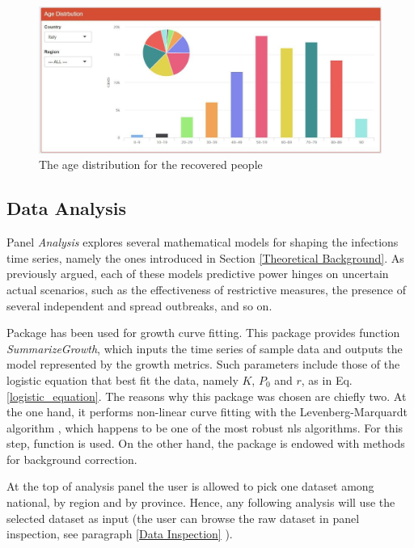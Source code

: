 \documentclass[
12pt, %
a4paper, %
oneside, %
headinclude,footinclude, %
BCOR5mm, %
]{scrartcl}
\begin{document}
\clearpage

\begin{figure}
  \centering
  \includegraphics[width=0.8\linewidth]{Figures/Age_distribution.jpg} 
  \caption{The age distribution for the recovered people}
  \label{fig:Age_distribution}
\end{figure}\hspace{0.3\textwidth}


\subsection{Data Analysis}\label{sub:Data Analysis}

Panel \textit{Analysis} explores  several mathematical models for shaping the infection\textquotesingle s time series, namely the ones introduced in Section \ref{Theoretical Background}. As previously argued, each of these model\textquotesingle s predictive power hinges on uncertain actual scenarios, such as the effectiveness of restrictive measures, the presence of several independent and spread outbreaks, and so on.

Package  \cite{growthcurver} has been used for growth curve fitting. This package provides function  \textit{SummarizeGrowth}, which inputs the time series of sample data and outputs the model represented by the growth metrics. Such parameters include those of the logistic equation that best fit the data, namely $K$, $P_0$ and $r$, as in Eq.\ref{logistic_equation}.
The reasons why this package was chosen are chiefly two. At the one hand, it performs non-linear curve fitting with the Levenberg-Marquardt algorithm \cite{more1978levenberg} , which happens to be one of the most robust nls algorithms. For this step, function \cite{nlsLM}  is used. On the other hand, the package is endowed with methods for background correction.


At the top of analysis panel the user is allowed to pick one dataset among national, by region and by province. Hence, any following analysis will use the selected dataset as input (the user can browse the raw dataset in panel inspection, see paragraph \ref{Data Inspection} ).
\end{document}
